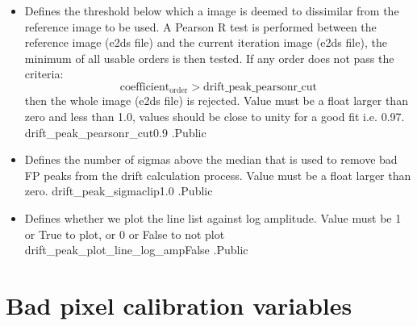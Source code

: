 \begin{itemize}
\item {}
{Defines the threshold below which a image is deemed to dissimilar from the reference image to be used. A Pearson R test is performed between the reference image (e2ds file) and the current iteration image (e2ds file), the minimum of all usable orders is then tested. If any order does not pass the criteria:
\begin{equation}
\text{coefficient}_{\text{order}} > \text{drift\_peak\_pearsonr\_cut}
\end{equation}
then the whole image (e2ds file) is rejected. Value must be a float larger than zero and less than 1.0, values should be close to unity for a good fit i.e. 0.97.
}
{drift\_peak\_pearsonr\_cut}{0.9}
{\calDRIFTPEAK}{\constantsfile}{\calDRIFTPEAK.\progMAIN}{Public}

\item {}
{Defines the number of sigmas above the median that is used to remove bad FP peaks from the drift calculation process. Value must be a float larger than zero.}
{drift\_peak\_sigmaclip}{1.0}
{\calDRIFTPEAK}{\constantsfile}{\calDRIFTPEAK.\progMAIN}{Public}

\item {}
{Defines whether we plot the line list against log amplitude. Value must be 1 or True to plot, or 0 or False to not plot}
{drift\_peak\_plot\_line\_log\_amp}{False}
{\calDRIFTPEAK}{\constantsfile}{\calDRIFTPEAK.\progMAIN}{Public}


\end{itemize}





\clearpage
\newpage
\section{Bad pixel calibration variables}
\label{ch:variables:badpix}

